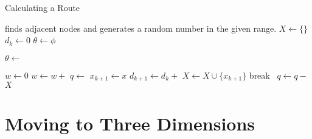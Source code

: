 \documentclass[twocolumn,11pt]{article}
\begin{document}
\begin{algorithm}[t!]
  \caption{Calculating a Route} \label{alg:grow}
  \begin{algorithmic}
    \Require {} finds adjacent nodes and  generates
    a random number in the given range.
    \State $X \gets \{\}$ 
    \State $d_k \gets 0$
    \State $\theta \gets \phi$

      \State $\theta \gets$ 

      \State $w \gets 0$ 
        \State $w \gets w +$
      \EndFor
      \State $q \gets$  
          \State $x_{k+1} \gets x$
          \State $d_{k+1} \gets d_k +$
          \State $X \gets X \cup \{x_{k+1}\}$
          \State break
        \Else~$q \gets q -$
        \EndIf
      \EndFor
    \EndWhile
    \State \Return $X$
  \EndFunction

  \end{algorithmic}
\end{algorithm}

\section{Moving to Three Dimensions} \label{sec:latlong}
\end{document}
